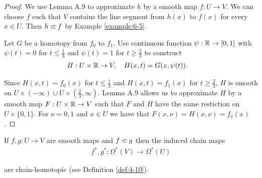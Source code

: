 \begin{proof}
  We use Lemma A.9 to approximate $h$ by a smooth map $f:U\to V$. We
can choose $f$ such that $V$ contains the line segment from $h(x)$ to $f(x)$ for every
$x\in U$. Then $h\backsimeq f$ by Example \ref{example:6-5}.

Let $G$ be a homotopy from $f_0$ to $f_1$. Use continuous function $\psi:\mathbb{R}\to[0, 1]$ with 
$\psi(t) = 0$ for $t\le \frac13$ and $\psi(t) = 1$ for $t\ge \frac23$ to construct 
\begin{align*}
  H:U\times\mathbb{R} &\to V, \quad H(x, t) = G(x, \psi(t)).
\end{align*}

Since $H(x, t) = f_0(x)$ for $t\le\frac13$ and $H(x, t) = f_1(x)$ for $t\ge\frac23$, $H$ is smooth 
on $U\times(-\infty)\cup U\times(\frac23, \infty)$. Lemma A.9 allows us to approximate $H$ by a smooth map 
$F:U\times\mathbb{R}\to V$ such that $F$ and $H$ have the same restiction on $U\times\{0, 1\}$. For $\nu=0, 1$ and $x\in U$
we have that $F(x, \nu) = H(x, \nu) = f_\nu(x)$.
\end{proof}



\begin{theorem}\label{theorem:6-7}
If $f, g:U\to V$ are smooth maps and $f\backsimeq g$ then the induced chain maps 
\begin{align*}
  f^*,g^*:\Omega^*(V)\to \Omega^*(U)
\end{align*}

are chain-homotopic (see Definition \ref{def:4-10}).
\end{theorem}

